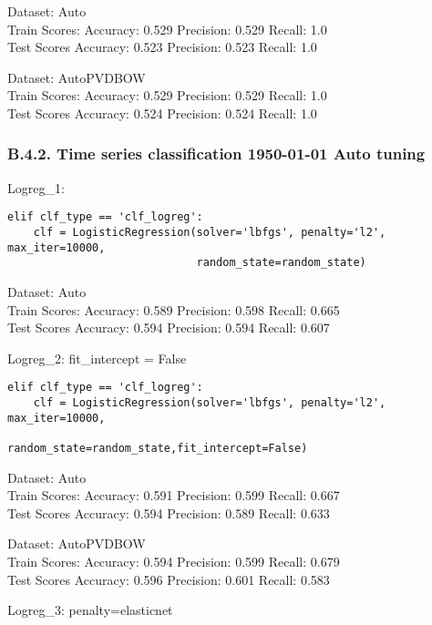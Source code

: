 \documentclass[11pt,preprint, authoryear]{elsarticle}
\numberwithin{equation}{section}
\numberwithin{figure}{section}
\numberwithin{table}{section}
\begin{document}
Dataset: Auto\\
Train Scores: Accuracy: 0.529 Precision: 0.529 Recall: 1.0\\
Test Scores Accuracy: 0.523 Precision: 0.523 Recall: 1.0

Dataset: AutoPVDBOW\\
Train Scores: Accuracy: 0.529 Precision: 0.529 Recall: 1.0\\
Test Scores Accuracy: 0.524 Precision: 0.524 Recall: 1.0

\hypertarget{b.4.2.-time-series-classification-1950-01-01-auto-tuning}{%
\subsubsection*{B.4.2. Time series classification 1950-01-01 Auto
tuning}\label{b.4.2.-time-series-classification-1950-01-01-auto-tuning}}

Logreg\_1:

\begin{verbatim}
elif clf_type == 'clf_logreg':
    clf = LogisticRegression(solver='lbfgs', penalty='l2', max_iter=10000,
                             random_state=random_state)
\end{verbatim}

Dataset: Auto\\
Train Scores: Accuracy: 0.589 Precision: 0.598 Recall: 0.665\\
Test Scores Accuracy: 0.594 Precision: 0.594 Recall: 0.607

Logreg\_2: fit\_intercept = False

\begin{verbatim}
elif clf_type == 'clf_logreg':
    clf = LogisticRegression(solver='lbfgs', penalty='l2', max_iter=10000,
                             random_state=random_state,fit_intercept=False)
\end{verbatim}

Dataset: Auto\\
Train Scores: Accuracy: 0.591 Precision: 0.599 Recall: 0.667\\
Test Scores Accuracy: 0.594 Precision: 0.589 Recall: 0.633

Dataset: AutoPVDBOW\\
Train Scores: Accuracy: 0.594 Precision: 0.599 Recall: 0.679\\
Test Scores Accuracy: 0.596 Precision: 0.601 Recall: 0.583

Logreg\_3: penalty=elasticnet
\end{document}
